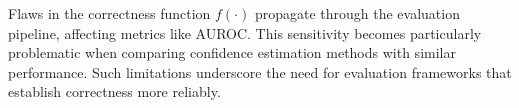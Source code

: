 

Flaws in the correctness function $f(\cdot)$ propagate through the evaluation pipeline, affecting metrics like AUROC. This sensitivity becomes particularly problematic when comparing confidence estimation methods with similar performance. Such limitations underscore the need for evaluation frameworks that establish correctness more reliably.



